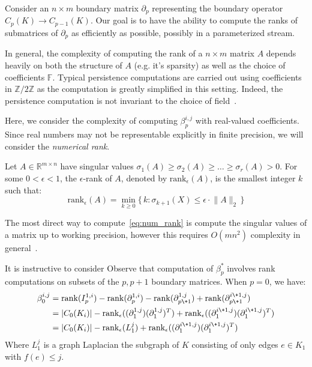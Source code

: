 Consider an $n \times m$ boundary matrix $\partial_p$ representing the boundary operator $C_p(K) \to C_{p-1}(K)$. 
Our goal is to have the ability to compute the ranks of submatrices of $\partial_p$ as efficiently as possible, possibly in a parameterized stream.

In general, the complexity of computing the rank of a $n \times m$ matrix $A$ depends heavily on both the structure of $A$ (e.g. it's sparsity) as well as the choice of coefficients $\mathbb{F}$. Typical persistence computations are carried out using coefficients in $\mathbb{Z}/2\mathbb{Z}$ as the computation is greatly simplified in this setting. 
Indeed, the persistence computation is not invariant to the choice of field~\cite{}.

Here, we consider the complexity of computing $\beta_p^{i,j}$ with real-valued coefficients. Since real numbers may not be representable explicitly in finite precision, we will consider the \emph{numerical rank}.
\begin{definition}
Let $A \in \mathbb{R}^{m \times n}$ have singular values $\sigma_1(A) \geq \sigma_2(A) \geq \dots \geq \sigma_r(A) > 0$. For some $0 < \epsilon < 1$, the $\epsilon$-rank of $A$, denoted by $\mathrm{rank}_{\epsilon}(A)$, is the smallest integer $k$ such that: 
\begin{equation}\label{eq:num_rank}
	\mathrm{rank}_{\epsilon}(A) = %
	\min_{k \geq 0} \{ \, k : \sigma_{k+1}(X) \leq \epsilon \cdot \lVert A \rVert_2 \, \} 
\end{equation}
\end{definition}
\noindent
The most direct way to compute~\eqref{eq:num_rank} is compute the singular values of a matrix up to working precision, however this requires $O(mn^2)$ complexity in general~\cite{}. 

It is instructive to consider 
Observe that computation of $\beta_p^{\ast}$ involves rank computations on subsets of the $p, p+1$ boundary matrices. When $p = 0$, we have: 
\begin{align*}
	\beta_0^{i,j} &= \mathrm{rank}(I_p^{1,i}) - \mathrm{rank}(\partial_p^{1,i}) - \mathrm{rank}(\partial_{p\+1 }^{1,j}) + \mathrm{rank}(\partial_{p\+1}^{i \+ 1, j} ) \\
	&= \lvert C_0(K_i) \rvert - \mathrm{rank}_{\epsilon}((\partial_{1 }^{1,j}) (\partial_{1 }^{1,j})^T ) + \mathrm{rank}_\epsilon((\partial_{1}^{i \+ 1, j})(\partial_{1}^{i \+ 1, j})^T) \\
	&= \lvert C_0(K_i) \rvert - \mathrm{rank}_{\epsilon}(L_1^{j}) + \mathrm{rank}_\epsilon((\partial_{1}^{i \+ 1, j})(\partial_{1}^{i \+ 1, j})^T)
\end{align*}  
Where $L_1^j$ is a graph Laplacian the subgraph of $K$ consisting of only edges $e \in K_1$ with $f(e) \leq j$.


